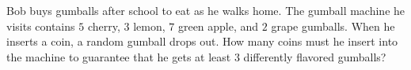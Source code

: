Bob buys gumballs after school to eat as he walks home. The gumball machine he visits contains $5$ cherry, $3$ lemon, $7$ green apple, and $2$ grape gumballs. When he inserts a coin, a random gumball drops out. How many coins must he insert into the machine to guarantee that he gets at least $3$ differently flavored gumballs?
